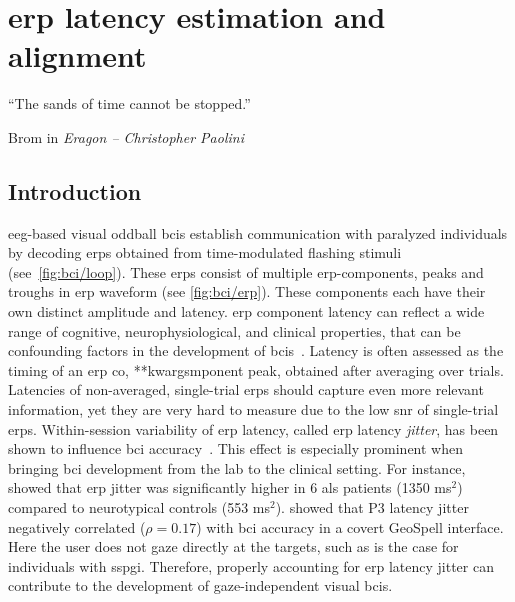 \chapter{\Acs{erp} latency estimation and alignment}
\label{sec:wcble}
\epigraph{``The sands of time cannot be stopped.''}{Brom in \emph{Eragon --
Christopher Paolini}}

\section{Introduction}
\label{sec:wcble/intro}

\Ac{eeg}-based visual oddball \acp{bci} establish communication with paralyzed
individuals by decoding \acp{erp} obtained from time-modulated flashing
stimuli (see~\cref{fig:bci/loop}).
These \acp{erp} consist of multiple \ac{erp}-components, peaks and troughs in
\ac{erp} waveform (see \cref{fig:bci/erp}).
These components each have their own distinct amplitude and latency.
\Ac{erp} component latency can reflect a wide range of cognitive,
neurophysiological, and clinical properties, that can be confounding factors in
the development of \acp{bci}~\cite{Luck2014}.
Latency is often assessed as the timing of an \ac{erp} co, **kwargsmponent peak, obtained
after averaging over trials.
Latencies of non-averaged, single-trial \acp{erp} should capture even more
relevant information, yet they are very hard to measure due to the low \ac{snr} of
single-trial \acp{erp}.
Within-session variability of \ac{erp} latency, called \ac{erp} latency
\emph{jitter}, has been shown to influence \ac{bci}
accuracy~\cite{Thompson2012}.
This effect is especially prominent when bringing \ac{bci} development from the
lab to the clinical setting.
For instance, \textcite{Zisk2021} showed that \ac{erp} jitter was significantly higher
in 6 \ac{als} patients (1350 ms$^2$) compared to neurotypical controls
(553 ms$^2$).
\textcite{Arico2014} showed that P3 latency jitter negatively correlated
($\rho=0.17$) with \ac{bci} accuracy in a covert GeoSpell interface.
Here the user does not gaze directly at the targets, such as is
the case for individuals with \ac{sspgi}.
Therefore, properly accounting for \ac{erp} latency jitter can contribute to
the development of gaze-independent visual \acp{bci}.


